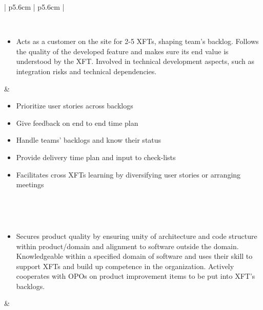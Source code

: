 \begin{table}
\begin{tabularx}{\textwidth}{ | p{5.6cm} | p{5.6cm} | }
   \\ \hline

   
   \\ \hline
   
   \begin{itemize}[label={}, leftmargin=*, topsep=0pt, itemsep=0pt, partopsep=0pt]
     \item Acts as a customer on the site for 2-5 XFTs, shaping team's backlog. Follows the quality of the developed feature and makes sure its end value is understood by the XFT. Involved in technical development aspects, such as integration risks and technical dependencies.
   \end{itemize} & 
   
   \begin{itemize}[label={}, leftmargin=*, topsep=0pt, itemsep=0pt, partopsep=0pt]
     \item Prioritize user stories across backlogs
     \item Give feedback on end to end time plan
     \item Handle teams' backlogs and know their status
     \item Provide delivery time plan and input to check-lists
     \item Facilitates cross XFTs learning by diversifying user stories or arranging meetings 
   \end{itemize} 
   
   \\ \hline

   
   \\ \hline
   
   \begin{itemize}[label={}, leftmargin=*, topsep=0pt, itemsep=0pt, partopsep=0pt]
     \item Secures product quality by ensuring unity of architecture and code structure within product/domain and alignment to software outside the domain. Knowledgeable within a specified domain of software and uses their skill to support XFTs and build up competence in the organization. Actively cooperates with OPOs on product improvement items to be put into XFT's backlogs.
   \end{itemize} & 
   

\end{tabularx}
\end{table}
